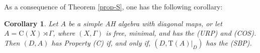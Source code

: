 \documentclass[12pt, oneside, psamsfonts]{amsart}
\newtheorem{cor}[thm]{Corollary}
\theoremstyle{definition}
\theoremstyle{remark}
\numberwithin{equation}{section}
\newcommand{\norm}[1]{\| #1\|}
\newcommand{\tr}{\mathrm{T}}
\begin{document}
%
%
%
%
%
%
%
%
%
%



As a consequence of Theorem \ref{prop-S}, one has the following corollary: %

\begin{cor}\label{Z-SBP}
Let $A$ be a simple AH algebra with diagonal maps, or let $A = \mathrm{C}(X)\rtimes\Gamma$, where $(X, \Gamma)$ is free, minimal, and has the (URP) and (COS). Then $(D, A)$ has Property (C) if, and only if, $(D, \tr(A)|_D)$ has the (SBP).
%
\end{cor}
\end{document}
